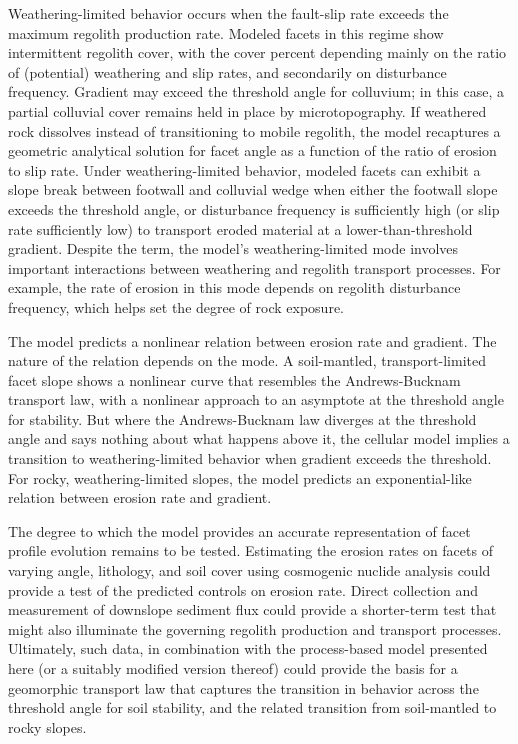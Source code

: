 Weathering-limited behavior occurs when the fault-slip rate exceeds the maximum regolith production rate. Modeled facets in this regime show intermittent regolith cover, with the cover percent depending mainly on the ratio of (potential) weathering and slip rates, and secondarily on disturbance frequency. Gradient may exceed the threshold angle for colluvium; in this case, a partial colluvial cover remains held in place by microtopography. If weathered rock dissolves instead of transitioning to mobile regolith, the model recaptures a geometric analytical solution for facet angle as a function of the ratio of erosion to slip rate. Under weathering-limited behavior, modeled facets can exhibit a slope break between footwall and colluvial wedge when either the footwall slope exceeds the threshold angle, or disturbance frequency is sufficiently high (or slip rate sufficiently low) to transport eroded material at a lower-than-threshold gradient. Despite the term, the model's weathering-limited mode involves important interactions between weathering and regolith transport processes. For example, the rate of erosion in this mode depends on regolith disturbance frequency, which helps set the degree of rock exposure.

The model predicts a nonlinear relation between erosion rate and gradient. The nature of the relation depends on the mode. A soil-mantled, transport-limited facet slope shows a nonlinear curve that resembles the Andrews-Bucknam transport law, with a nonlinear approach to an asymptote at the threshold angle for stability. But where the Andrews-Bucknam law diverges at the threshold angle and says nothing about what happens above it, the cellular model implies a transition to weathering-limited behavior when gradient exceeds the threshold. For rocky, weathering-limited slopes, the model predicts an exponential-like relation between erosion rate and gradient.

The degree to which the model provides an accurate representation of facet profile evolution remains to be tested. Estimating the erosion rates on facets of varying angle, lithology, and soil cover using cosmogenic nuclide analysis could provide a test of the predicted controls on erosion rate. Direct collection and measurement of downslope sediment flux could provide a shorter-term test that might also illuminate the governing regolith production and transport processes. Ultimately, such data, in combination with the process-based model presented here (or a suitably modified version thereof) could provide the basis for a geomorphic transport law that captures the transition in behavior across the threshold angle for soil stability, and the related transition from soil-mantled to rocky slopes.

